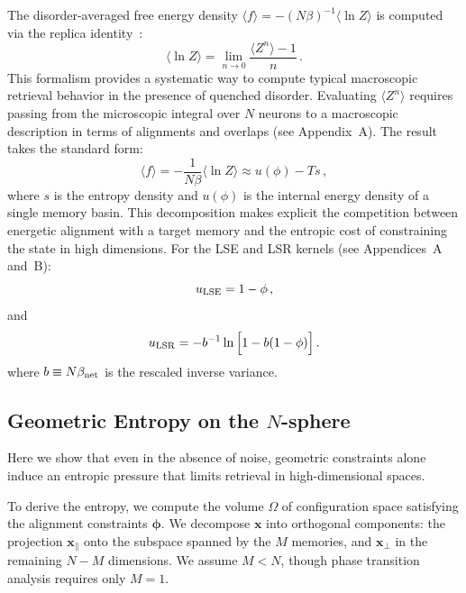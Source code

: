 \documentclass{article}
\theoremstyle{plain}
\theoremstyle{definition}
\theoremstyle{remark}
\begin{document}
The disorder-averaged free energy density $\langle f \rangle = -(N\beta)^{-1} \langle \ln Z \rangle$ is computed via the replica identity~\citep{sk75}:
\begin{equation}
    \langle \ln Z \rangle = \lim_{n \to 0} \frac{\langle Z^n \rangle - 1}{n}\,.
    \label{eq:limit}
\end{equation}
This formalism provides a systematic way to compute typical macroscopic retrieval behavior in the presence of quenched disorder.
Evaluating $\langle Z^n \rangle$ requires passing from the microscopic integral over $N$ neurons to a macroscopic description in terms of alignments and overlaps (see Appendix~A). The result takes the standard form:
\begin{equation}
    \langle f \rangle = -\frac{1}{N\beta} \langle \ln Z \rangle 
    \approx  u(\phi) - T s\,,
\end{equation}
where $s$ is the entropy density and $u(\phi)$ is the internal energy density of a single memory basin. This decomposition makes explicit the competition between energetic alignment with a target memory and the entropic cost of constraining the state in high dimensions.
For the LSE and LSR kernels (see Appendices~A and~B):
\begin{equation}
    u_{\rm LSE} = 1-\phi\,,
    \label{eq:u_lse}
\end{equation}
and 
\begin{equation}
    u_{\rm LSR} = -b^{-1} \ln \Big[1 - b (1-\phi) \Big]\,.
    \label{eq:u_lsr}
\end{equation}
where $b\equiv N \beta_{\rm net}$ is the rescaled inverse variance.

\subsection{Geometric Entropy on the $N$-sphere}

Here we show that even in the absence of noise, geometric constraints alone induce an entropic pressure that limits retrieval in high-dimensional spaces.

To derive the entropy, we compute the volume $\Omega$ of configuration space satisfying the alignment constraints $\bm{\phi}$. We decompose $\bm{x}$ into orthogonal components: the projection $\bm{x}_{\parallel}$ onto the subspace spanned by the $M$ memories, and $\bm{x}_{\perp}$ in the remaining $N-M$ dimensions. We assume $M < N$, though phase transition analysis requires only $M=1$.
\end{document}
